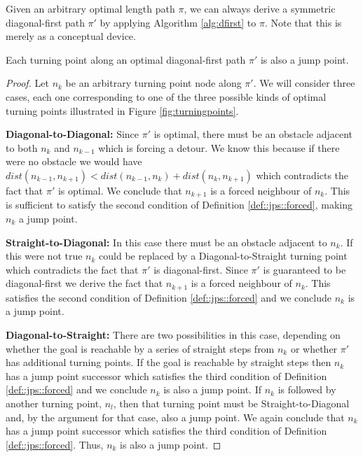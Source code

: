 Given an arbitrary optimal length path $\pi$, we can always derive a symmetric
diagonal-first path $\pi'$ by applying Algorithm \ref{alg:dfirst} to $\pi$.
Note that this is merely as a conceptual device.



\begin{lemma}
\label{lemma::jps::turningpoints}
Each turning point along an optimal diagonal-first path $\pi'$ is also a jump point.
\end{lemma}
\begin{proof}
Let $n_{k}$ be an arbitrary turning point node along $\pi'$. 
We will consider three cases, each one corresponding to one of the three
possible kinds of optimal turning points illustrated in Figure \ref{fig:turningpoints}. 

\textbf{Diagonal-to-Diagonal:} Since $\pi'$ is optimal, there must be an
obstacle adjacent to both $n_{k}$ and $n_{k-1}$ which is forcing a detour.
We know this because if there were no obstacle we would have 
$dist(n_{k-1}, n_{k+1}) < dist(n_{k-1}, n_{k}) + dist(n_{k}, n_{k+1})$ which contradicts
the fact that $\pi'$ is optimal.
We conclude that $n_{k+1}$ is a forced neighbour of $n_{k}$.
This is sufficient to satisfy the second condition of Definition
\ref{def::jps::forced}, making $n_{k}$ a jump point.

\textbf{Straight-to-Diagonal:} In this case there must be an 
obstacle adjacent to $n_{k}$. 
If this were not true $n_{k}$ could be replaced by a
Diagonal-to-Straight turning point which contradicts the fact that $\pi'$ is
diagonal-first.
Since $\pi'$ is guaranteed to be diagonal-first we derive the fact that $n_{k+1}$ is 
a forced neighbour of $n_{k}$.
This satisfies the second condition of Definition \ref{def::jps::forced} and we conclude
$n_{k}$ is a jump point.

\textbf{Diagonal-to-Straight:} There are two possibilities in this case, 
depending on whether the goal is reachable by a series of straight steps
from $n_{k}$ or whether $\pi'$ has additional turning points. If the goal
is reachable by straight steps then $n_{k}$ has a jump point successor which satisfies the
third condition of Definition \ref{def::jps::forced} and we conclude $n_{k}$ is
also a jump point.
If $n_{k}$ is followed by another turning point, $n_{l}$, then that turning
point must be Straight-to-Diagonal and, by the argument for that case, 
also a jump point.
We again conclude that $n_{k}$ has a jump point successor which satisfies
the third condition of Definition \ref{def::jps::forced}. Thus, $n_{k}$ is
also a jump point.
\end{proof}

